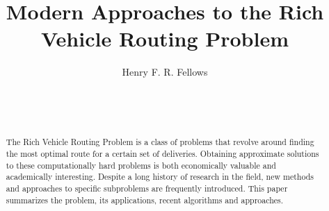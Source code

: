 \documentclass{sig-alternate}
\begin{document}

\title{Modern Approaches to the Rich Vehicle Routing Problem}


\author{
\alignauthor
Henry F. R. Fellows\\
	\\
	\\
	\\
}

\maketitle
\begin{abstract}

The Rich Vehicle Routing Problem is a class of problems that revolve around finding the most optimal route for a certain set of deliveries. Obtaining approximate solutions to these computationally hard problems is both economically valuable and academically interesting. Despite a long history of research in the field, new methods and approaches to specific subproblems are frequently introduced. This paper summarizes the problem, its applications, recent algorithms and approaches.


\end{abstract}

\end{document}
